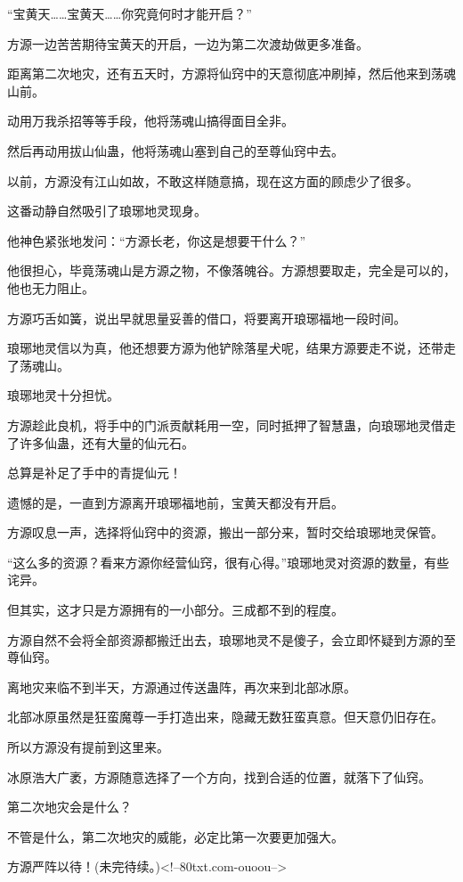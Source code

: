\begin{this_body}
“宝黄天……宝黄天……你究竟何时才能开启？”

方源一边苦苦期待宝黄天的开启，一边为第二次渡劫做更多准备。

距离第二次地灾，还有五天时，方源将仙窍中的天意彻底冲刷掉，然后他来到荡魂山前。

动用万我杀招等等手段，他将荡魂山搞得面目全非。

然后再动用拔山仙蛊，他将荡魂山塞到自己的至尊仙窍中去。

以前，方源没有江山如故，不敢这样随意搞，现在这方面的顾虑少了很多。

这番动静自然吸引了琅琊地灵现身。

他神色紧张地发问：“方源长老，你这是想要干什么？”

他很担心，毕竟荡魂山是方源之物，不像落魄谷。方源想要取走，完全是可以的，他也无力阻止。

方源巧舌如簧，说出早就思量妥善的借口，将要离开琅琊福地一段时间。

琅琊地灵信以为真，他还想要方源为他铲除落星犬呢，结果方源要走不说，还带走了荡魂山。

琅琊地灵十分担忧。

方源趁此良机，将手中的门派贡献耗用一空，同时抵押了智慧蛊，向琅琊地灵借走了许多仙蛊，还有大量的仙元石。

总算是补足了手中的青提仙元！

遗憾的是，一直到方源离开琅琊福地前，宝黄天都没有开启。

方源叹息一声，选择将仙窍中的资源，搬出一部分来，暂时交给琅琊地灵保管。

“这么多的资源？看来方源你经营仙窍，很有心得。”琅琊地灵对资源的数量，有些诧异。

但其实，这才只是方源拥有的一小部分。三成都不到的程度。

方源自然不会将全部资源都搬迁出去，琅琊地灵不是傻子，会立即怀疑到方源的至尊仙窍。

离地灾来临不到半天，方源通过传送蛊阵，再次来到北部冰原。

北部冰原虽然是狂蛮魔尊一手打造出来，隐藏无数狂蛮真意。但天意仍旧存在。

所以方源没有提前到这里来。

冰原浩大广袤，方源随意选择了一个方向，找到合适的位置，就落下了仙窍。

第二次地灾会是什么？

不管是什么，第二次地灾的威能，必定比第一次要更加强大。

方源严阵以待！(未完待续。)<!--80txt.com-ouoou-->

\end{this_body}

